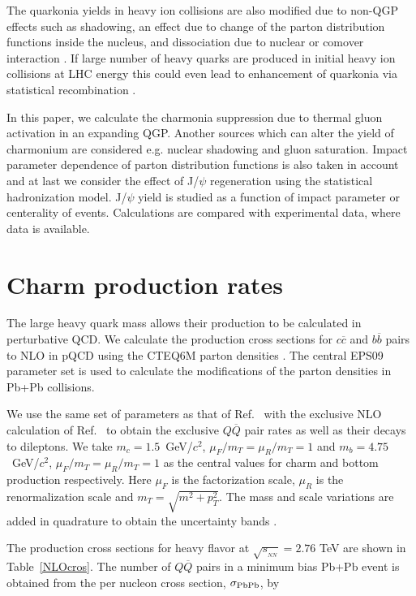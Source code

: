 \documentclass[aps,prc,preprint,superscriptaddress,showpacs,showkeys]{revtex4-1}
\begin{document}
  The quarkonia yields in heavy ion collisions are also modified due to non-QGP effects such as
shadowing, an effect due to change of the parton distribution functions inside the nucleus,
and dissociation due to nuclear or comover interaction \cite{Vogt}.
  If large number of heavy quarks are produced in initial heavy ion collisions at LHC energy 
this could even lead to enhancement of quarkonia via statistical recombination \cite{Rapp1,Rapp2}. 
   
 In this paper, we calculate the charmonia suppression due to thermal gluon activation  in an expanding
QGP. Another sources which can alter the yield of charmonium are considered e.g. nuclear shadowing 
and gluon saturation. Impact parameter dependence of parton distribution functions is also taken in account
and at last we consider the effect of J/$\psi$ regeneration using the statistical hadronization model.
J/$\psi$ yield is studied as a function of impact parameter or centerality of events. Calculations are compared
with experimental data, where data is available.



\section{Charm production rates}

  
  The large heavy quark mass allows their production to be calculated in 
perturbative QCD.  We calculate the production cross sections for 
$c\overline c$ and  $b\overline b$ pairs to NLO in pQCD  using
the CTEQ6M parton densities \cite{CTEQ6}.  The central EPS09 parameter set 
\cite{EPS09} is used to calculate the modifications of the parton densities in 
Pb+Pb collisions.  
 
 We use the same set of parameters
as that of Ref.~\cite{CNV} with the exclusive NLO calculation of Ref.~\cite{MNR}
to obtain the exclusive $Q \overline Q$ pair rates as well as their decays
to dileptons.  We take $m_c = 1.5$~GeV/$c^2$, $\mu_F/m_T = \mu_R/m_T = 1$ and  
$m_b = 4.75$~GeV/$c^2$, $\mu_F/m_T = \mu_R/m_T = 1$ as the central values for
charm and bottom production respectively.  Here $\mu_F$ is the factorization 
scale, $\mu_R$ is the renormalization scale and $m_T = \sqrt{m^2 + p_T^2}$.  
The mass and scale variations are added in quadrature to obtain the uncertainty
bands \cite{CNV,ContinuumVKShuk}.
    
  
  The production cross sections for heavy flavor at $\sqrt{s_{_{NN}}}= 2.76$ 
TeV are shown in Table~\ref{NLOcros}.  The number of $Q \overline Q$ pairs
in a minimum bias Pb+Pb event is obtained from the per nucleon cross
section, $\sigma_{\rm PbPb}$, by
\end{document}
